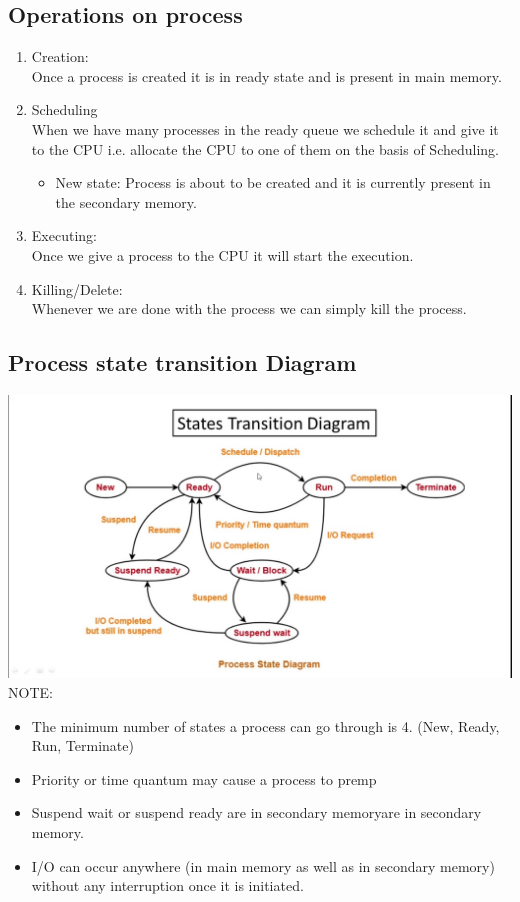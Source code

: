 \documentclass[12pt,letterpaper]{article}
\begin{document}
\subsection{Operations on process}
\begin{enumerate}
  \item Creation:\\ Once a process is created it is in ready state and is present in main memory. 
  \item Scheduling\\ When we have many processes in the ready queue we schedule it and give it to the CPU i.e. allocate the CPU to one of them on the basis of Scheduling. 
    \begin{itemize}
      \item New state: Process is about to be created and it is currently present in the secondary memory. 
    \end{itemize}
  \item Executing:\\ Once we give a process to the CPU it will start the execution. 
  \item Killing/Delete:\\ Whenever we are done with the process we can simply kill the process. 
\end{enumerate}

\subsection{Process state transition Diagram}
\includegraphics[width=\textwidth]{Imports/processstatetransition.png}
NOTE:\\
\begin{itemize}
  \item The minimum number of states a process can go through is 4. (New, Ready, Run, Terminate)
  \item Priority or time quantum may cause a process to premp
  \item Suspend wait or suspend ready are in secondary memoryare in secondary memory.
  \item I/O can occur anywhere (in main memory as well as in secondary memory) without any interruption once it is initiated. 
\end{itemize}
\end{document}
